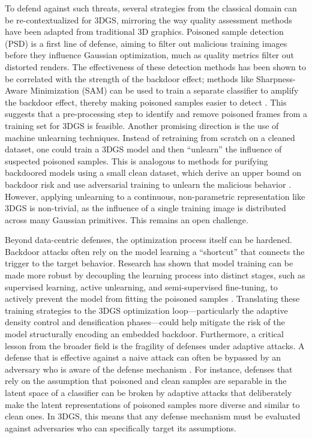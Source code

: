\documentclass[11pt]{article}
\begin{document}
To defend against such threats, several strategies from the classical domain can be re-contextualized for 3DGS, mirroring the way quality assessment methods have been adapted from traditional 3D graphics. Poisoned sample detection (PSD) is a first line of defense, aiming to filter out malicious training images before they influence Gaussian optimization, much as quality metrics filter out distorted renders. The effectiveness of these detection methods has been shown to be correlated with the strength of the backdoor effect; methods like Sharpness-Aware Minimization (SAM) can be used to train a separate classifier to amplify the backdoor effect, thereby making poisoned samples easier to detect \cite{ref750}. This suggests that a pre-processing step to identify and remove poisoned frames from a training set for 3DGS is feasible. Another promising direction is the use of machine unlearning techniques. Instead of retraining from scratch on a cleaned dataset, one could train a 3DGS model and then ``unlearn'' the influence of suspected poisoned samples. This is analogous to methods for purifying backdoored models using a small clean dataset, which derive an upper bound on backdoor risk and use adversarial training to unlearn the malicious behavior \cite{ref751}. However, applying unlearning to a continuous, non-parametric representation like 3DGS is non-trivial, as the influence of a single training image is distributed across many Gaussian primitives. This remains an open challenge.

Beyond data-centric defenses, the optimization process itself can be hardened. Backdoor attacks often rely on the model learning a ``shortcut'' that connects the trigger to the target behavior. Research has shown that model training can be made more robust by decoupling the learning process into distinct stages, such as supervised learning, active unlearning, and semi-supervised fine-tuning, to actively prevent the model from fitting the poisoned samples \cite{ref752}. Translating these training strategies to the 3DGS optimization loop---particularly the adaptive density control and densification phases---could help mitigate the risk of the model structurally encoding an embedded backdoor. Furthermore, a critical lesson from the broader field is the fragility of defenses under adaptive attacks. A defense that is effective against a naive attack can often be bypassed by an adversary who is aware of the defense mechanism \cite{ref753}. For instance, defenses that rely on the assumption that poisoned and clean samples are separable in the latent space of a classifier can be broken by adaptive attacks that deliberately make the latent representations of poisoned samples more diverse and similar to clean ones. In 3DGS, this means that any defense mechanism must be evaluated against adversaries who can specifically target its assumptions.
\end{document}
